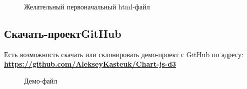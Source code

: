 \documentclass[a4paper,14pt]{extreport}
\begin{document}
\newpage
\begin{figure}[h]
\caption{Желательный первоначальный html-файл}
\label{ris:image}
\end{figure}
\subsection{Скачать-проект\enspace GitHub}
\hspace{4ex}Есть возможность скачать или склонировать демо-проект с GitHub по адресу: \\
\hspace{4ex}\textbf{\href{https://github.com/AlekseyKasteuk/Chart-js-d3}{https://github.com/AlekseyKasteuk/Chart-js-d3}}
\newpage
\begin{figure}[h]
\caption{Демо-файл}
\label{ris:image}
\end{figure}
\end{document}
